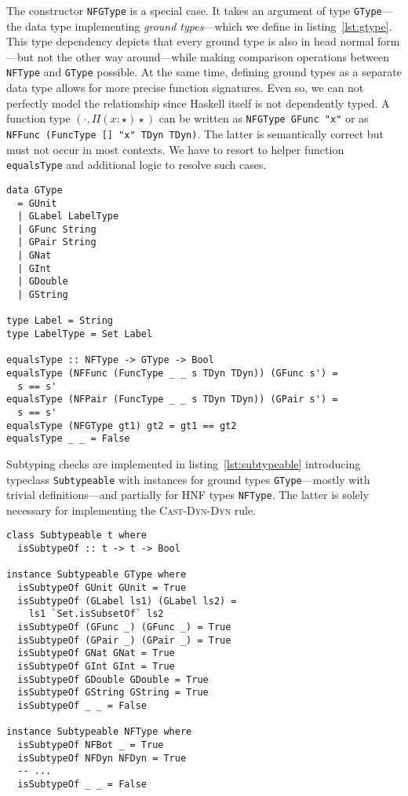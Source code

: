 The constructor \texttt{NFGType} is a special case. It takes an argument of type \texttt{GType}---the data type implementing \emph{ground types}---which we define in listing~\ref{lst:gtype}. This type dependency depicts that every ground type is also in head normal form---but not the other way around---while making comparison operations between \texttt{NFType} and \texttt{GType} possible. At the same time, defining ground types as a separate data type allows for more precise function signatures. Even so, we can not perfectly model the relationship since Haskell itself is not dependently typed. A function type $(\cdot, \Pi(x:\star)\star)$ can be written as \texttt{NFGType GFunc "x"} or as \texttt{NFFunc (FuncType [] "x" TDyn TDyn)}. The latter is semantically correct but must not occur in most contexts. We have to resort to helper function \texttt{equalsType} and additional logic to resolve such cases.

\begin{lstlisting}[float,
  caption=Haskell: Ground type definition (\texttt{ProcessEnvironment.hs}),
  label=lst:gtype]
data GType
  = GUnit
  | GLabel LabelType
  | GFunc String
  | GPair String
  | GNat
  | GInt
  | GDouble
  | GString

type Label = String
type LabelType = Set Label

equalsType :: NFType -> GType -> Bool
equalsType (NFFunc (FuncType _ _ s TDyn TDyn)) (GFunc s') =
  s == s'
equalsType (NFPair (FuncType _ _ s TDyn TDyn)) (GPair s') =
  s == s'
equalsType (NFGType gt1) gt2 = gt1 == gt2
equalsType _ _ = False
\end{lstlisting}

Subtyping checks are implemented in listing~\ref{lst:subtypeable} introducing typeclass \texttt{Subtypeable} with instances for ground types \texttt{GType}---mostly with trivial definitions---and partially for HNF types \texttt{NFType}. The latter is solely necessary for implementing the \textsc{Cast-Dyn-Dyn} rule.

\begin{lstlisting}[float,
  label=lst:subtypeable,
  caption=Haskell: Subtypeable typeclass (\texttt{ProcessEnvironment.hs})]
class Subtypeable t where
  isSubtypeOf :: t -> t -> Bool

instance Subtypeable GType where
  isSubtypeOf GUnit GUnit = True
  isSubtypeOf (GLabel ls1) (GLabel ls2) =
    ls1 `Set.isSubsetOf` ls2
  isSubtypeOf (GFunc _) (GFunc _) = True
  isSubtypeOf (GPair _) (GPair _) = True
  isSubtypeOf GNat GNat = True
  isSubtypeOf GInt GInt = True
  isSubtypeOf GDouble GDouble = True
  isSubtypeOf GString GString = True
  isSubtypeOf _ _ = False

instance Subtypeable NFType where
  isSubtypeOf NFBot _ = True
  isSubtypeOf NFDyn NFDyn = True
  -- ...
  isSubtypeOf _ _ = False
\end{lstlisting}

